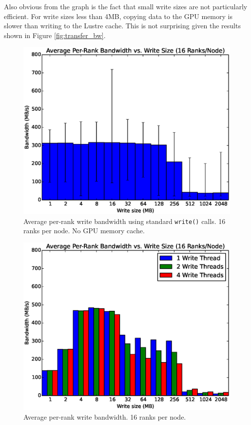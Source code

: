 Also obvious from the graph is the fact that small write sizes are not particularly efficient.  For write sizes less than 4MB, copying data to the GPU memory is slower than writing to the Lustre cache.  This is not surprising given the results shown in Figure \ref{fig:transfer_bw}.



\begin{figure}
\includegraphics[width=\linewidth]{figures/figure_6.eps}
\caption{Average per-rank write bandwidth using standard \texttt{write()} calls.  16 ranks per node. No GPU memory cache.} 
\label{fig:results_base_16}
\end{figure}

\begin{figure}
\includegraphics[width=\linewidth]{figures/figure_4.eps}
\caption{Average per-rank write bandwidth.  16 ranks per node.} 
\label{fig:results_16_nobars}
\end{figure}

